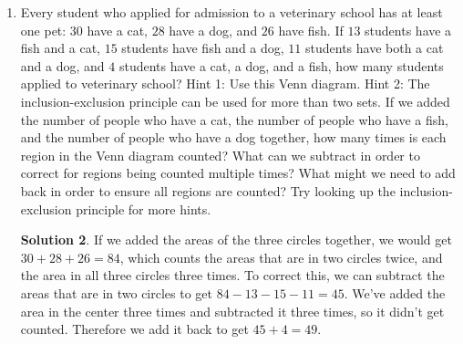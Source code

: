 \documentclass{article}
\theoremstyle{definition}
\newtheorem*{solution}{Solution}
\begin{document}
\begin{enumerate}
\begin{solution}
            Another way to do this would be to recognize that a rectangle can be 
            defined by the position of its four sides. There are three ways to 
            choose two of the three horizontal lines to be the top and bottom of 
            the rectangle, and there are six ways to choose two of the four 
            vertical lines to be the sides of the rectangle, so there are $3 
            \cdot 6 = 18$ rectangles.
        \end{solution}
    \item Every student who applied for admission to a veterinary school has at 
        least one pet: $30$ have a cat, $28$ have a dog, and $26$ have fish. If 
        $13$ students have a fish and a cat, $15$ students have fish and a dog, 
        $11$ students have both a cat and a dog, and $4$ students have a cat, a 
        dog, and a fish, how many students applied to veterinary school? Hint 1: 
        Use this Venn diagram. Hint 2: The inclusion-exclusion principle can be 
        used for more than two sets. If we added the number of people who have a 
        cat, the number of people who have a fish, and the number of people who 
        have a dog together, how many times is each region in the Venn diagram 
        counted? What can we subtract in order to correct for regions being 
        counted multiple times? What might we need to add back in order to 
        ensure all regions are counted? Try looking up the inclusion-exclusion 
        principle for more hints.
        \begin{center}
        \end{center}
        \begin{solution}
            If we added the areas of the three circles together, we would get 
            $30 + 28 + 26 = 84$, which counts the areas that are in two circles 
            twice, and the area in all three circles three times. To correct 
            this, we can subtract the areas that are in two circles to get $84 - 
            13 - 15 - 11 = 45$. We've added the area in the center three times 
            and subtracted it three times, so it didn't get counted. Therefore 
            we add it back to get $45 + 4 = 49$.


\end{solution}
\end{enumerate}
\end{document}
